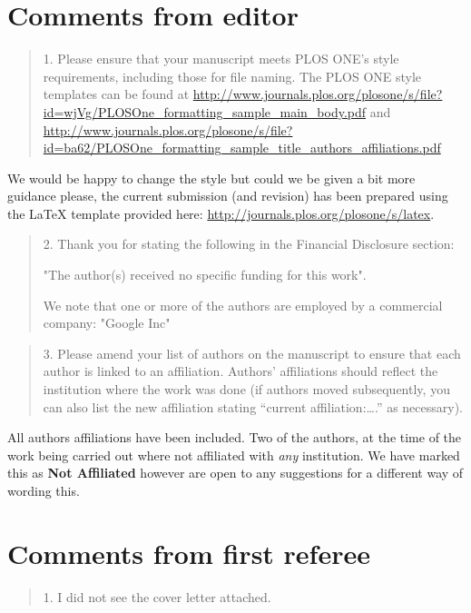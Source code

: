 \documentclass[a4]{article}
\begin{document}
\section{Comments from editor}

\begin{quote}
	1. Please ensure that your manuscript meets PLOS ONE's style requirements,
	including those for file naming. The PLOS ONE style templates can be found at
	\url{http://www.journals.plos.org/plosone/s/file?id=wjVg/PLOSOne_formatting_sample_main_body.pdf}
	and
	\url{http://www.journals.plos.org/plosone/s/file?id=ba62/PLOSOne_formatting_sample_title_authors_affiliations.pdf}
\end{quote}

We would be happy to change the style but could we be given a bit more guidance
please, the current submission (and revision) has been prepared using the LaTeX
template provided here: \url{http://journals.plos.org/plosone/s/latex}.

\begin{quote}
	2. Thank you for stating the following in the Financial Disclosure section:

	"The author(s) received no specific funding for this work".

	We note that one or more of the authors are employed by a commercial company: "Google Inc"
\end{quote}


\begin{quote}
3. Please amend your list of authors on the manuscript to ensure that each
author is linked to an affiliation. Authors’ affiliations should reflect the
institution where the work was done (if authors moved subsequently, you can
also list the new affiliation stating “current affiliation:….” as necessary).
\end{quote}

All authors affiliations have been included. Two of the authors, at the time of
the work being carried out where not affiliated with \textit{any} institution.
We have marked this as \textbf{Not Affiliated} however are open to any
suggestions for a different way of wording this.

\section{Comments from first referee}

\begin{quote}
    1. I did not see the cover letter attached.
\end{quote}
\end{document}
